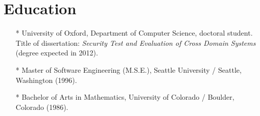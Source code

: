 \documentclass[letterpaper]{article}
\begin{document}
\section*{Education} %

\begin{itemize}
    \item[*] University of Oxford, Department of Computer Science,
		doctoral student.  Title of dissertation: \emph{Security Test and Evaluation
		of Cross Domain Systems} (degree expected in 2012).

    \item[*] Master of Software Engineering (M.S.E.), Seattle
		University / Seattle, Washington (1996).

    \item[*] Bachelor of Arts in Mathematics, University of
		Colorado / Boulder, Colorado (1986).
\end{itemize}
\end{document}
